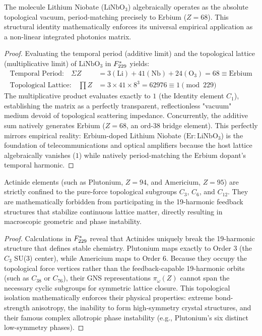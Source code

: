 \begin{theorem}
\label{thm:linbo3-vacuum}
The molecule Lithium Niobate ($\mathrm{LiNbO}_3$) algebraically operates as the absolute topological vacuum, period-matching precisely to Erbium ($Z=68$). This structural identity mathematically enforces its universal empirical application as a non-linear integrated photonics matrix.
\end{theorem}

\begin{proof}
Evaluating the temporal period (additive limit) and the topological lattice (multiplicative limit) of $\mathrm{LiNbO}_3$ in $F_{229}^*$ yields:
\begin{align*}
    \text{Temporal Period:} \quad \Sigma Z &= 3 (\mathrm{Li}) + 41 (\mathrm{Nb}) + 24 (\mathrm{O}_3) = 68 \equiv \text{Erbium} \\
    \text{Topological Lattice:} \quad \prod Z &= 3 \times 41 \times 8^3 = 62976 \equiv 1 \pmod{229}
\end{align*}
The multiplicative product evaluates exactly to $1$ (the Identity element $C_1$), establishing the matrix as a perfectly transparent, reflectionless "vacuum" medium devoid of topological scattering impedance. Concurrently, the additive sum natively generates Erbium ($Z=68$, an $\mathrm{ord}$-38 bridge element). This perfectly mirrors empirical reality: Erbium-doped Lithium Niobate ($\mathrm{Er:LiNbO}_3$) is the foundation of telecommunications and optical amplifiers because the host lattice algebraically vanishes ($1$) while natively period-matching the Erbium dopant's temporal harmonic.
\qedhere
\end{proof}

\begin{theorem}
\label{thm:actinide-instability}
Actinide elements (such as Plutonium, $Z=94$, and Americium, $Z=95$) are strictly confined to the pure-force topological subgroups $C_3$, $C_6$, and $C_{12}$. They are mathematically forbidden from participating in the 19-harmonic feedback structures that stabilize continuous lattice matter, directly resulting in macroscopic geometric and phase instability.
\end{theorem}

\begin{proof}
Calculations in $F_{229}^*$ reveal that Actinides uniquely break the 19-harmonic structure that defines stable chemistry. Plutonium maps exactly to Order 3 (the $C_3$ SU(3) center), while Americium maps to Order 6. Because they occupy the topological force vertices rather than the feedback-capable 19-harmonic orbits (such as $C_{38}$ or $C_{76}$), their GNS representations $\pi_\omega(Z)$ cannot span the necessary cyclic subgroups for symmetric lattice closure. This topological isolation mathematically enforces their physical properties: extreme bond-strength anisotropy, the inability to form high-symmetry crystal structures, and their famous complex allotropic phase instability (e.g., Plutonium's six distinct low-symmetry phases).
\qedhere
\end{proof}

